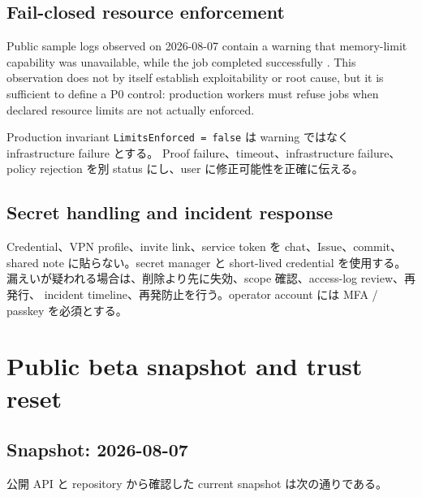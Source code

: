 \documentclass[a4paper,11pt]{ltjsarticle}
\begin{document}
\subsection{Fail-closed resource enforcement}

Public sample logs observed on 2026-08-07 contain a warning that memory-limit capability was unavailable, while the job completed successfully
\cite{tfsample}. This observation does not by itself establish exploitability or root cause, but it is sufficient to define a P0 control:
production workers must refuse jobs when declared resource limits are not actually enforced.

\begin{warningbox}{Production invariant}
\texttt{LimitsEnforced = false} は warning ではなく infrastructure failure とする。
Proof failure、timeout、infrastructure failure、policy rejection を別 status にし、user に修正可能性を正確に伝える。
\end{warningbox}

\subsection{Secret handling and incident response}

Credential、VPN profile、invite link、service token を chat、Issue、commit、shared note に貼らない。secret manager と
short-lived credential を使用する。漏えいが疑われる場合は、削除より先に失効、scope 確認、access-log review、再発行、
incident timeline、再発防止を行う。operator account には MFA / passkey を必須とする。

\section{Public beta snapshot and trust reset}

\subsection{Snapshot: 2026-08-07}

公開 API と repository から確認した current snapshot は次の通りである\cite{tfstats,tfrepo,leanreleases}。
\end{document}
